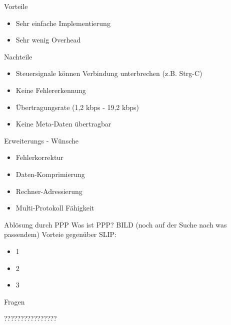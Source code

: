 \documentclass[beamer]{uibk}
\begin{document}
\begin{frame}{}
    \begin{block}{Vorteile}
      \begin{itemize}
        \item Sehr einfache Implementierung
        \item Sehr wenig Overhead
      \end{itemize}
    \end{block}

    \begin{alertblock}{Nachteile}
      \begin{itemize}
        \item Steuersignale können Verbindung unterbrechen (z.B. Strg-C)
        \item Keine Fehlererkennung
        \item Übertragungsrate (1,2 kbps - 19,2 kbps)
        \item Keine Meta-Daten übertragbar
      \end{itemize}
    \end{alertblock}

\end{frame}

\begin{frame}{Erweiterungs - Wünsche}
  \begin{itemize}
    \item Fehlerkorrektur
    \item Daten-Komprimierung
    \item Rechner-Adressierung
    \item Multi-Protokoll Fähigkeit
  \end{itemize}

\end{frame}

\begin{frame}{Ablösung durch PPP}
Was ist PPP?\newline
BILD (noch auf der Suche nach was passendem)\newline
Vorteie gegenüber SLIP:
  \begin{itemize}
    \item 1
    \item 2
    \item 3
  \end{itemize}

\end{frame}

\begin{frame}{Fragen}
\begin{center}
  ????????????????
\end{center}

\end{frame}
\end{document}
